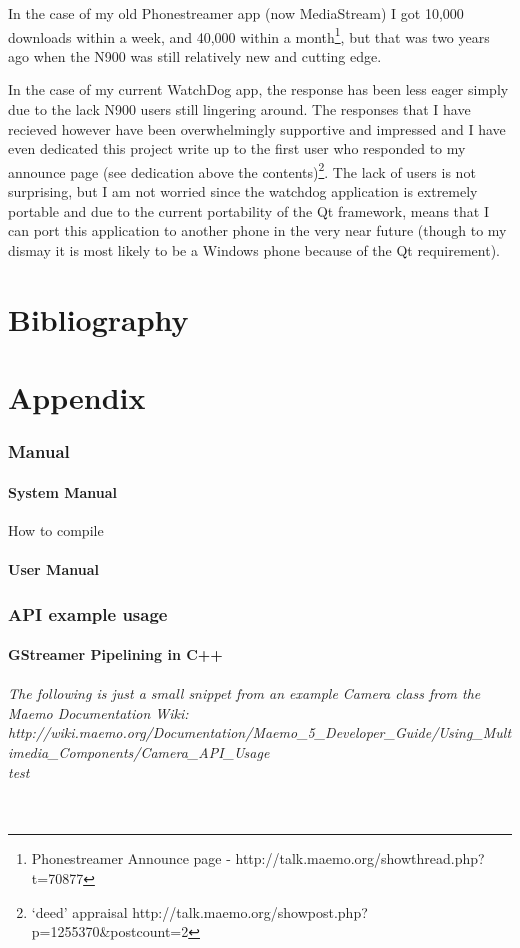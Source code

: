 \documentclass[11pt]{article} %
\begin{document}
In the case of my old Phonestreamer app (now MediaStream) I got 10,000 downloads within a week, and 40,000 within a month\footnote{Phonestreamer Announce page - http://talk.maemo.org/showthread.php?t=70877}, but that was two years ago when the N900 was still relatively new and cutting edge.

In the case of my current WatchDog app, the response has been less eager simply due to the lack N900 users still lingering around. The responses that I have recieved however have been overwhelmingly supportive and impressed and I have even dedicated this project write up to the first user who responded to my announce page (see dedication above the contents)\footnote{‘deed’ appraisal http://talk.maemo.org/showpost.php?p=1255370\&postcount=2}. The lack of users is not surprising, but I am not worried since the watchdog application is extremely portable and due to the current portability of the Qt framework, means that I can port this application to another phone in the very near future (though to my dismay it is most likely to be a Windows phone because of the Qt requirement).


\part{Bibliography}

\part{Appendix}
\section{Manual}
\subsection{System Manual}{How to compile}
\subsection{User Manual}

\section{API example usage}
\subsection{GStreamer Pipelining in C++}
\paragraph{ The following is just a small snippet from an example Camera class from the Maemo Documentation Wiki:\\http://wiki.maemo.org/Documentation/Maemo\_5\_Developer\_Guide/Using\_Multimedia\_Components/Camera\_API\_Usage
\\ test\\\\}

\end{document}
